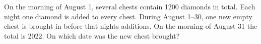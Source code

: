 On the morning of August 1, several chests contain 1200 diamonds in total. Each night one diamond is added to every chest. During August 1--30, one new empty chest is brought in before that night\textquotesingle s additions. On the morning of August 31 the total is 2022. On which date was the new chest brought?
